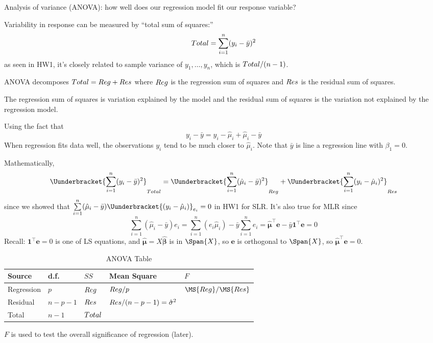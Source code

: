 Analysis of variance (ANOVA): how well
does our regression model fit our
response variable?

Variability in response can be measured by
``total sum of squares:''
\[ \relax{Total} =
    \sum\limits_{i=1}^{n} (y_i-\bar{y})^2 \]
as seen in HW1, it's closely related to
sample variance of $ y_1,\ldots,y_n $,
which is $ \relax{Total}/(n-1) $.

ANOVA decomposes $ \relax{Total}=\relax{Reg}+\relax{Res} $
where $ \relax{Reg} $ is the regression sum of squares
and $ \relax{Res} $ is the residual sum of squares.

The regression sum of squares is variation explained by
the model
and the residual sum of squares is the variation not
explained by the regression model.

Using the fact that
\[ y_i-\bar{y}=y_i-\hat{\mu}_i+\hat{\mu}_i-\bar{y} \]
When regression fits data well,
the observations $ y_i $ tend to be much closer to $ \hat{\mu}_i $.
Note that $ \bar{y} $ is line a regression line with $ \beta_1=0 $.

Mathematically,
\[ \Uunderbracket{\sum\limits_{i=1}^{n} (y_i-\bar{y})^2}_{\SS{Total}}
    =\Uunderbracket{\sum\limits_{i=1}^{n} (\hat{\mu}_i-\bar{y})^2}_{\SS{Reg}}+
    \Uunderbracket{\sum\limits_{i=1}^{n} (y_i-\hat{\mu}_i)^2}_{\SS{Res}} \]
since we showed that $ \sum\limits_{i=1}^{n}(\hat{\mu}_i-\bar{y})
    \Uunderbracket{(y_i-\hat{\mu}_i)}_{e_i}=0 $ in HW1 for SLR\@.
It's also true for MLR since
\[ \sum\limits_{i=1}^{n} (\hat{\mu}_i-\bar{y})e_i=
    \sum\limits_{i=1}^{n} (e_i\hat{\mu}_i)-\bar{y}\sum\limits_{i=1}^{n} e_i
    =\hat{\symbf{\mu}}^\top\symbf{e}-\bar{y}\symbf{1}^\top\symbf{e}=0 \]
Recall: $ \symbf{1}^\top\symbf{e}=0 $ is one of LS equations,
and $ \hat{\symbf{\mu}}=X\hat{\symbf{\beta}} $ is in $ \Span{X} $,
so $ \symbf{e} $ is orthogonal to $ \Span{X} $,
so $ \hat{\symbf{\mu}}^\top\symbf{e}=0 $.

\begin{table}[ht]
    \centering
    \caption{ANOVA Table}
    \begin{tabularx}{\linewidth}{@{}>{\hsize}Y>{\hsize}YYYY@{}}
        \toprule
        Source     & d.f.      & $ SS $         & Mean Square                         & $ F $                 \\
        \midrule
        Regression & $ p $     & $ \relax{Reg} $   & $ \relax{Reg}/p $                      & $ \MS{Reg}/\MS{Res} $ \\
        Residual   & $ n-p-1 $ & $ \relax{Res} $   & $ \relax{Res}/(n-p-1)=\hat{\sigma}^2 $                         \\
        \midrule
        Total      & $ n-1 $   & $ \relax{Total} $                                                               \\
        \bottomrule
    \end{tabularx}
\end{table}
$ F $ is used to test the overall significance of regression (later).

